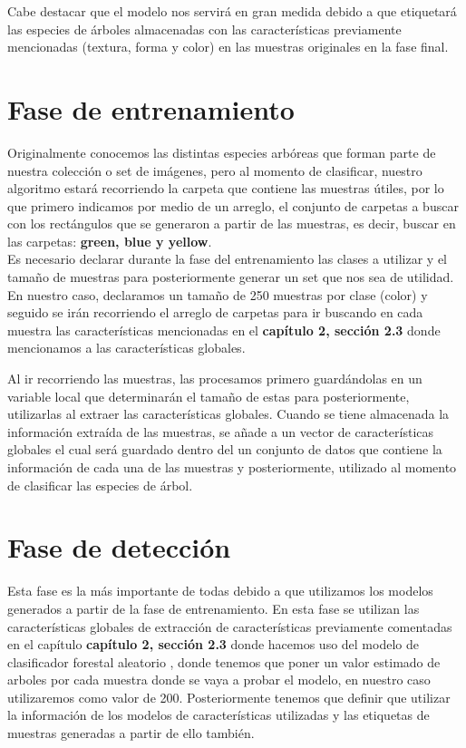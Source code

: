 Cabe destacar que el modelo nos servirá en gran medida debido a que etiquetará las especies de árboles almacenadas con las características previamente mencionadas (textura, forma y color) en las muestras originales en la fase final.

\section{Fase de entrenamiento}
Originalmente conocemos las distintas especies arbóreas que forman parte de nuestra colección o set de imágenes, pero al momento de clasificar, nuestro algoritmo estará recorriendo la carpeta que contiene las muestras útiles, por lo que primero indicamos por medio de un arreglo, el conjunto de carpetas a buscar con los rectángulos que se generaron a partir de las muestras, es decir, buscar en las carpetas: \textbf{green, blue y yellow}. \\

Es necesario declarar durante la fase del entrenamiento las clases a utilizar y el tamaño de muestras para posteriormente generar un set que nos sea de utilidad. En nuestro caso, declaramos un tamaño de 250 muestras por clase (color) y seguido se irán recorriendo el arreglo de carpetas para ir buscando en cada muestra las características mencionadas en el \textbf{capítulo 2, sección 2.3} donde mencionamos a las características globales.

Al ir recorriendo las muestras, las procesamos primero guardándolas en un variable local que determinarán el tamaño de estas para posteriormente, utilizarlas al extraer las características globales. Cuando se tiene almacenada la información extraída de las muestras, se añade a un vector de características globales el cual será guardado dentro del un conjunto de datos que contiene la información de cada una de las muestras y posteriormente, utilizado al momento de clasificar las especies de árbol. 

\section{Fase de detección}
Esta fase es la más importante de todas debido a que utilizamos los modelos generados a partir de la fase de entrenamiento. En esta fase se utilizan las características globales de extracción de características previamente comentadas en el capítulo \textbf{capítulo 2, sección 2.3} donde hacemos uso del modelo de clasificador forestal aleatorio , donde tenemos que poner un valor estimado de arboles por cada muestra donde se vaya a probar el modelo, en nuestro caso utilizaremos como valor de 200. Posteriormente tenemos que definir que utilizar la información de los modelos de características utilizadas y las etiquetas de muestras generadas a partir de ello también. 
\\

